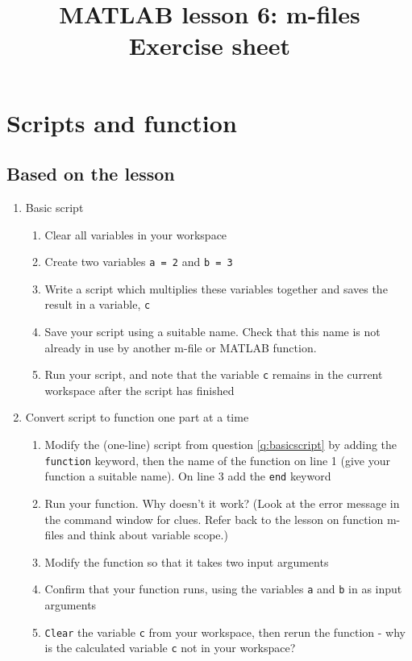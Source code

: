 \documentclass{article}
\title{MATLAB lesson 6: m-files\\Exercise sheet}
\date{}
\author{} %
\begin{document}
	\maketitle
	
	\section{Scripts and function}
	\subsection*{Based on the lesson}
	\begin{enumerate}
		\item Basic script
		\label{q:basicscript}
		\begin{enumerate}
			\item Clear all variables in your workspace
			\item Create two variables \texttt{a = 2} and \texttt{b = 3}
			\item Write a script which multiplies these variables together and saves the result in a variable, \texttt{c}
			\item Save your script using a suitable name. Check that this name is not already in use by another m-file or MATLAB function.	
			\item Run your script, and note that the variable \texttt{c} remains in the current workspace after the script has finished
		\end{enumerate}
		\item Convert script to function one part at a time
		\begin{enumerate}
			\item Modify the (one-line) script from question \ref{q:basicscript} by adding the \texttt{function} keyword, then the name of the function on line 1 (give your function a suitable name). On line 3 add the \texttt{end} keyword
			\item Run your function. Why doesn't it work? (Look at the error message in the command window for clues. Refer back to the lesson on function m-files and think about variable scope.)
			\item Modify the function so that it takes two input arguments
			\item Confirm that your function runs, using the variables \texttt{a} and \texttt{b} in as input arguments
			\item \texttt{Clear} the variable \texttt{c} from your workspace, then rerun the function - why is the calculated variable \texttt{c} not in your workspace?

\end{enumerate}
\end{enumerate}
\end{document}
